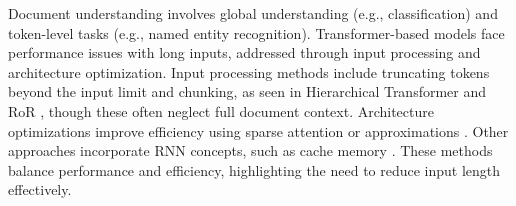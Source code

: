 \documentclass[11pt]{article}
\begin{document}
Document understanding involves global understanding (e.g., classification) and token-level tasks (e.g., named entity recognition). Transformer-based models face performance issues with long inputs, addressed through input processing and architecture optimization. Input processing methods include truncating tokens beyond the input limit \citep{park2022efficient} and chunking, as seen in Hierarchical Transformer \citep{pappagari2019hierarchical} and RoR \citep{zhao2021ror}, though these often neglect full document context. Architecture optimizations improve efficiency using sparse attention \citep{beltagy2020longformer, zaheer2020big, roy2021efficient} or approximations \citep{peng2021random, wang2020linformer, choromanski2020masked}. Other approaches incorporate RNN concepts, such as cache memory \citep{dai2019transformer, hutchins2022block, li-etal-2023-recurrent}. These methods balance performance and efficiency, highlighting the need to reduce input length effectively.
\end{document}

